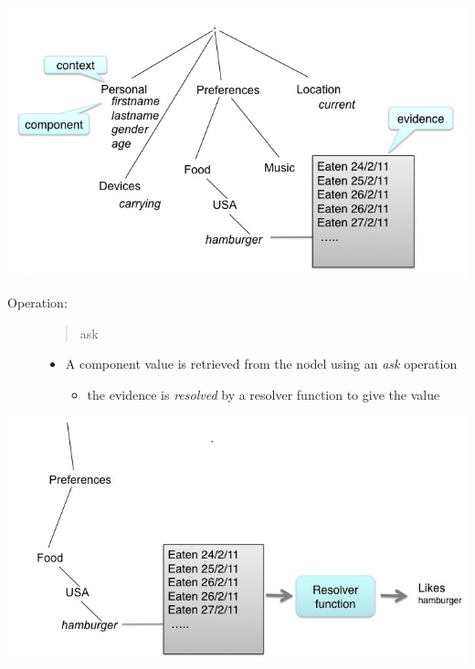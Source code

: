 \documentclass[letterpaper,10pt,english]{sphinxmanual}
\begin{document}
\includegraphics{accretion.jpg}
\begin{description}
\item[{Operation:}] \leavevmode\begin{quote}

ask
\end{quote}
\begin{itemize}
\item {} 
A component value is retrieved from the nodel using an \emph{ask} operation
\begin{itemize}
\item {} 
the evidence is \emph{resolved} by a resolver function to give the value

\end{itemize}

\end{itemize}

\end{description}

\includegraphics{resolution.jpg}
\end{document}
